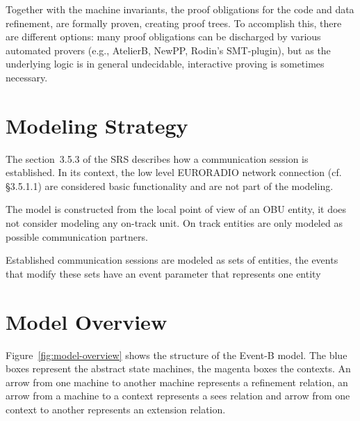 \documentclass[10pt,a4paper]{article}
\begin{document}
Together with the machine invariants, the proof obligations for the code and
data refinement, are formally proven, creating proof trees. To accomplish this,
there are different options: many proof obligations can be discharged by various
automated provers (e.g., AtelierB, NewPP, Rodin's SMT-plugin), but as the
underlying logic is in general undecidable, interactive proving is sometimes
necessary.

\section{Modeling Strategy}
\label{sec:modeling-strategy}

The section~3.5.3 of the SRS describes how a communication session is
established. In its context, the low level EURORADIO network connection
(cf. §3.5.1.1) are considered basic functionality and are not part of the
modeling.

The model is constructed from the local point of view of an OBU entity, it does
not consider modeling any on-track unit. On track entities are only modeled as
possible communication partners.

Established communication sessions are modeled as sets of entities, the events
that modify these sets have an event parameter that represents one entity

\section{Model Overview}
\label{sec:model-overview}

Figure~\ref{fig:model-overview} shows the structure of the Event-B model. The
blue boxes represent the abstract state machines, the magenta boxes the
contexts. An arrow from one machine to another machine represents a refinement
relation, an arrow from a machine to a context represents a sees relation and
arrow from one context to another represents an extension relation.
\end{document}
